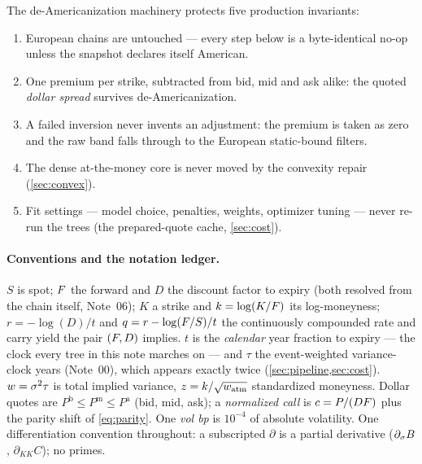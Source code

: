 \documentclass[11pt]{article}
\begin{document}
\begin{invariant}
The de-Americanization machinery protects five production invariants:
\begin{enumerate}[leftmargin=1.5em,itemsep=1pt]
\item European chains are untouched --- every step below is a byte-identical
no-op unless the snapshot declares itself American.
\item One premium per strike, subtracted from bid, mid and ask alike: the
quoted \emph{dollar spread} survives de-Americanization.
\item A failed inversion never invents an adjustment: the premium is taken
as zero and the raw band falls through to the European static-bound
filters.
\item The dense at-the-money core is never moved by the convexity repair
(\cref{sec:convex}).
\item Fit settings --- model choice, penalties, weights, optimizer tuning
--- never re-run the trees (the prepared-quote cache, \cref{sec:cost}).
\end{enumerate}
\end{invariant}

\paragraph{Conventions and the notation ledger.}
$S$ is spot; $F$ the forward and $D$ the discount factor to expiry (both
resolved from the chain itself, Note~06); $K$ a strike and
$k=\log(K/F)$ its log-moneyness; $r=-\log(D)/t$ and
$q=r-\log(F/S)/t$ the continuously compounded rate and carry yield the
pair $(F,D)$ implies.  $t$ is the \emph{calendar} year fraction to
expiry --- the clock every tree in this note marches on --- and $\tau$ the
event-weighted variance-clock years (Note~00), which appears exactly twice
(\cref{sec:pipeline,sec:cost}).  $w=\sigma^2\tau$ is total implied
variance, $z=k/\sqrt{w_{\mathrm{atm}}}$ standardized moneyness.  Dollar
quotes are $P^{\mathrm b}\le P^{\mathrm m}\le P^{\mathrm a}$ (bid, mid,
ask); a \emph{normalized call} is $c=P/(DF)$ plus the parity shift of
\cref{eq:parity}.  One \emph{vol bp} is $10^{-4}$ of absolute volatility.
One differentiation convention throughout: a subscripted $\partial$ is a
partial derivative ($\partial_\sigma B$, $\partial_{KK}C$); no primes.
\end{document}
